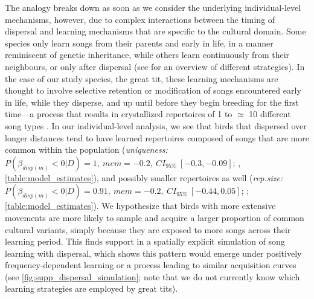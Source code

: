 \documentclass[9pt, onecolumn, twoside, lineno]{gsajnl}
\begin{document}
The analogy breaks down as soon as we consider the underlying individual-level mechanisms, however, due to complex interactions between the timing of dispersal and learning mechanisms that are specific to the cultural domain. Some species only learn songs from their parents and early in life, in a manner reminiscent of genetic inheritance, while others learn continuously from their neighbours, or only after dispersal (see \autocite{searcy2021} for an overview of different strategies). In the case of our study species, the great tit, these learning mechanisms are thought to involve selective retention or modification of songs encountered early in life, while they disperse, and up until before they begin breeding for the first time---a process that results in crystallized repertoires of 1 to $\simeq$ 10 different song types \autocite{mcgregor1982b,rivera-gutierrez2011,merinorecalde2023a}. In our individual-level analysis, we see that birds that dispersed over longer distances tend to have learned repertoires composed of songs that are more common within the population (\textit{uniqueness:} $P(\beta_{disp (m)} < 0 | D) = 1,~mem = -0.2,~CI_{95\%}~[-0.3, -0.09]$; , \autoref{table:model_estimates}), and possibly smaller repertoires as well (\textit{rep.size:} $P(\beta_{disp (m)} < 0 | D) = 0.91,~mem = -0.2,~CI_{95\%}~[-0.44, 0.05]$; ; \autoref{table:model_estimates}). We hypothesize that birds with more extensive movements are more likely to sample and acquire a larger proportion of common cultural variants, simply because they are exposed to more songs across their learning period. This finds support in a spatially explicit simulation of song learning with dispersal, which shows this pattern would emerge under positively frequency-dependent learning or a process leading to similar acquisition curves (see \autoref{fig:supp_dispersal_simulation}; note that we do not currently know which learning strategies are employed by great tits).
\end{document}
